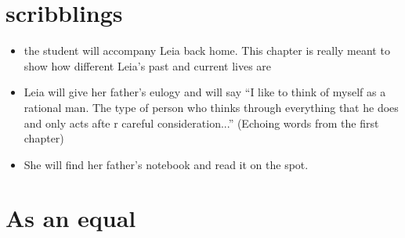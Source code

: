 \chapter{scribblings}

\begin{itemize}
\item the student will accompany Leia back home. This chapter is really meant to show how different Leia's past and current lives are
\item Leia will give her father's eulogy and will say ``I like to think of myself as a rational man.
The type of person who thinks through everything that he does and only acts afte r careful consideration...'' (Echoing words from the first chapter)
\item She will find her father's notebook and read it on the spot.
\end{itemize}
\chapter{As an equal}
